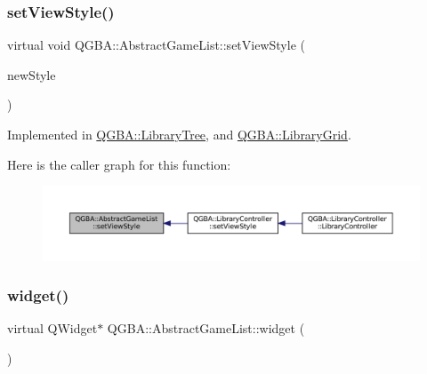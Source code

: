 \subsubsection{\texorpdfstring{set\+View\+Style()}{setViewStyle()}}
{\footnotesize\ttfamily virtual void Q\+G\+B\+A\+::\+Abstract\+Game\+List\+::set\+View\+Style (\begin{DoxyParamCaption}\item[{\mbox{\hyperlink{namespace_q_g_b_a_a4804d48d02699a2c1d2436e9269a8bb8}{Library\+Style}}}]{new\+Style }\end{DoxyParamCaption})\hspace{0.3cm}{\ttfamily [pure virtual]}}



Implemented in \mbox{\hyperlink{class_q_g_b_a_1_1_library_tree_a2782544a4651fbf6529cd495ec980d9a}{Q\+G\+B\+A\+::\+Library\+Tree}}, and \mbox{\hyperlink{class_q_g_b_a_1_1_library_grid_a5a2c5ce5dcd4452e7971f8eff5c3c7bd}{Q\+G\+B\+A\+::\+Library\+Grid}}.

Here is the caller graph for this function\+:
\nopagebreak
\begin{figure}[H]
\begin{center}
\leavevmode
\includegraphics[width=350pt]{class_q_g_b_a_1_1_abstract_game_list_af2f88dba7da390c2d89a362bafc5a6e4_icgraph}
\end{center}
\end{figure}
\mbox{\label{class_q_g_b_a_1_1_abstract_game_list_a1854b55a36d86e0695146872d37d19d2}} 
\subsubsection{\texorpdfstring{widget()}{widget()}}
{\footnotesize\ttfamily virtual Q\+Widget$\ast$ Q\+G\+B\+A\+::\+Abstract\+Game\+List\+::widget (\begin{DoxyParamCaption}{ }\end{DoxyParamCaption})\hspace{0.3cm}{\ttfamily [pure virtual]}}



